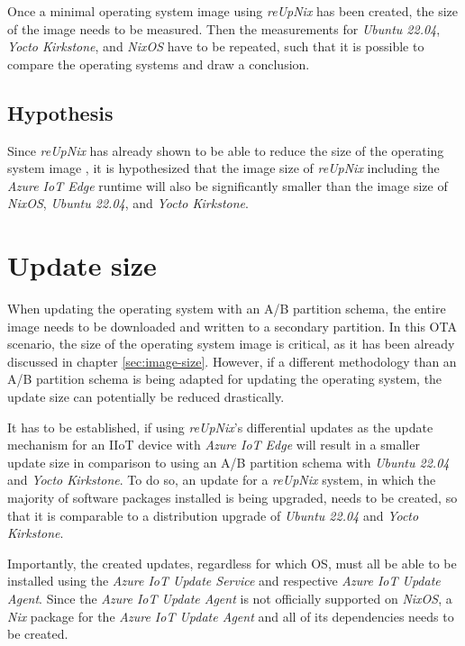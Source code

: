 Once a minimal operating system image using \textit{reUpNix} has been created, the size of the image
needs to be measured. Then the measurements for
\textit{Ubuntu 22.04}, \textit{Yocto Kirkstone}, and \textit{NixOS} have to be repeated, such that
it is possible to compare the operating systems and draw a conclusion.

\subsection{Hypothesis}
Since \textit{reUpNix} has already shown to be able to reduce the size of the
operating system image \cite{gollenstede:23:lctes}, it is hypothesized that the
image size of \textit{reUpNix} including the \textit{Azure IoT Edge} runtime
will also be significantly smaller than the image size of \textit{NixOS},
\textit{Ubuntu 22.04}, and \textit{Yocto Kirkstone}.


\section{Update size}
\label{sec:update-size}
When updating the operating system with an A/B partition schema, the entire
image needs to be downloaded and written to a secondary partition. In this
\ac{OTA} scenario, the size of the operating system image is critical, as it has been
already discussed in chapter \ref{sec:image-size}.
However, if a different methodology than an A/B partition schema is being adapted
for updating the operating system, the update size can potentially be reduced
drastically.

It has to be established, if using \textit{reUpNix}'s differential updates as the
update mechanism for an \ac{IIoT} device with \textit{Azure IoT Edge}
will result in a smaller update size in comparison to using an A/B partition schema with
\textit{Ubuntu 22.04} and \textit{Yocto Kirkstone}. To do so, an update for a \textit{reUpNix} system,
in which the majority of software packages installed is being upgraded, needs to be created, so that it is comparable
to a distribution upgrade of \textit{Ubuntu 22.04} and \textit{Yocto Kirkstone}.

Importantly, the created updates, regardless for which \ac{OS}, must all be
able to be installed using the \textit{Azure IoT Update Service} and respective
\textit{Azure IoT Update Agent}. Since the \textit{Azure IoT Update Agent} is
not officially supported on \textit{NixOS}, a \textit{Nix} package
for the \textit{Azure IoT Update Agent} and all of its dependencies needs to be created.

